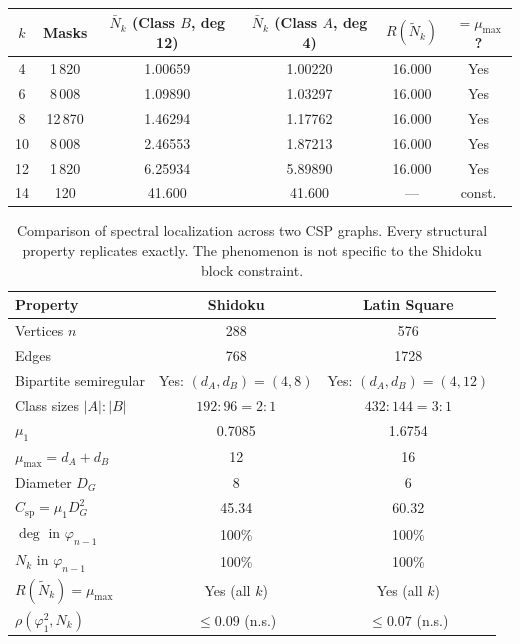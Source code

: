 \documentclass[11pt]{article}
\theoremstyle{definition}
\theoremstyle{remark}
\newcommand{\Csp}{C_{\mathrm{sp}}}
\begin{document}
\begin{center}
\begin{tabular}{cccccc}
\toprule
$k$ & Masks & $\bar{N}_k$ (Class $B$, deg 12) & $\bar{N}_k$ (Class $A$, deg 4) & $R(\tilde{N}_k)$ & $= \mu_{\max}$? \\
\midrule
4  & 1\,820 & 1.00659 & 1.00220 & 16.000 & Yes \\
6  & 8\,008 & 1.09890 & 1.03297 & 16.000 & Yes \\
8  & 12\,870 & 1.46294 & 1.17762 & 16.000 & Yes \\
10 & 8\,008 & 2.46553 & 1.87213 & 16.000 & Yes \\
12 & 1\,820 & 6.25934 & 5.89890 & 16.000 & Yes \\
14 & 120 & 41.600 & 41.600 & --- & const. \\
\bottomrule
\end{tabular}
\end{center}

\begin{table}[h]
\centering
\begin{tabular}{lcc}
\toprule
Property & Shidoku & Latin Square \\
\midrule
Vertices $n$ & 288 & 576 \\
Edges & 768 & 1728 \\
Bipartite semiregular & Yes: $(d_A, d_B) = (4, 8)$ & Yes: $(d_A, d_B) = (4, 12)$ \\
Class sizes $|A| : |B|$ & $192 : 96 = 2{:}1$ & $432 : 144 = 3{:}1$ \\
$\mu_1$ & 0.7085 & 1.6754 \\
$\mu_{\max} = d_A + d_B$ & 12 & 16 \\
Diameter $D_G$ & 8 & 6 \\
$\Csp = \mu_1 D_G^2$ & 45.34 & 60.32 \\
$\deg$ in $\varphi_{n-1}$  & 100\% & 100\% \\
$N_k$ in $\varphi_{n-1}$  & 100\% & 100\% \\
$R(\tilde{N}_k) = \mu_{\max}$ & Yes (all $k$) & Yes (all $k$) \\
$\rho(\varphi_1^2, N_k)$ & $\le 0.09$ (n.s.) & $\le 0.07$ (n.s.) \\
\bottomrule
\end{tabular}
\caption{Comparison of spectral localization across two CSP graphs. Every structural property replicates exactly. The phenomenon is not specific to the Shidoku block constraint.}
\label{tab:comparison}
\end{table}
\end{document}

